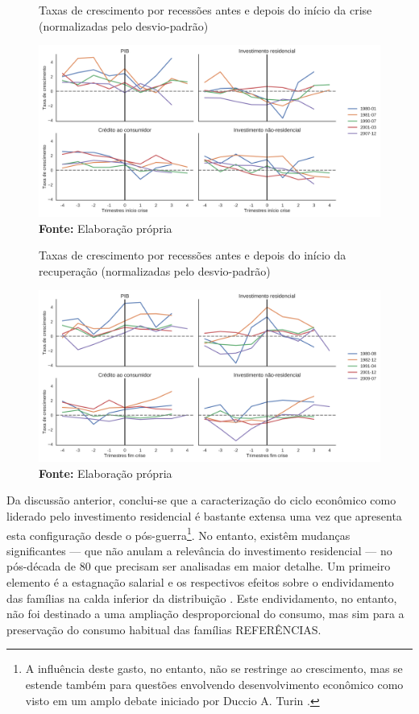 \begin{figure}[H]
	\centering
	\caption{Taxas de crescimento por recessões antes e depois do início da crise (normalizadas pelo desvio-padrão)}
	\label{FigCriseNorm}
	\includegraphics[width=\textwidth]{../../Dados/Fatos_Estilizados/figs/Centrado_Inicio_Norm.png}
	\caption*{\textbf{Fonte:} Elaboração própria}
\end{figure}

\begin{figure}[H]
	\centering
	\caption{Taxas de crescimento por recessões antes e depois do início da recuperação (normalizadas pelo desvio-padrão)}
	\label{FigRecuperacaoNorm}
	\includegraphics[width=\textwidth]{../../Dados/Fatos_Estilizados/figs/Centrado_Fim_Norm.png}
	\caption*{\textbf{Fonte:} Elaboração própria}
\end{figure}



Da discussão anterior, conclui-se que a caracterização do ciclo econômico como liderado pelo investimento residencial é bastante extensa uma vez que apresenta esta configuração desde o pós-guerra\footnote{
	A influência deste gasto, no entanto, não se restringe ao crescimento, mas se estende também para questões envolvendo desenvolvimento econômico como visto em um amplo debate iniciado por Duccio A. Turin \cite{pheng_revisit_1992}.}.
No entanto, existêm mudanças significantes --- que não anulam a relevância do investimento residencial --- no pós-década de 80 que precisam ser analisadas em maior detalhe.
Um primeiro elemento é a estagnação salarial e os respectivos efeitos sobre o endividamento das famílias na calda inferior da distribuição \cites{barba_rising_2009}{teixeira_uma_2011}. 
Este endividamento, no entanto, não foi destinado a uma ampliação desproporcional do consumo, mas sim para a preservação do consumo habitual das famílias
\cite{wolf_rising_2010} REFERÊNCIAS.



